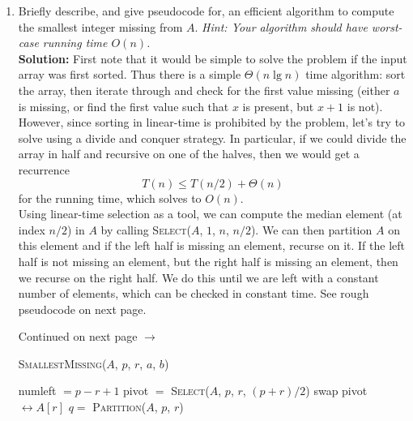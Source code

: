 \documentclass[letterpaper,11pt]{article}
\begin{document}
\begin{enumerate}
\begin{enumerate}
\item Briefly describe, and give pseudocode for, an efficient algorithm to compute the smallest integer missing from $A$. \emph{Hint: Your algorithm should have worst-case running time $O(n)$.} \\

\textbf{Solution:} First note that it would be simple to solve the problem if the input array was first sorted. Thus there is a simple $\Theta(n\lg n)$ time algorithm: sort the array, then iterate through and check for the first value missing (either $a$ is missing, or find the first value such that $x$ is present, but $x+1$ is not).\\

However, since sorting in linear-time is prohibited by the problem, let's try to solve using a divide and conquer strategy. In particular, if we could divide the array in half and recursive on one of the halves, then we would get a recurrence
\[T(n) \leq T(n/2) + \Theta(n)\]
for the running time, which solves to $O(n)$.\\

Using linear-time selection as a tool, we can compute the median element (at index $n/2$) in $A$ by calling \textsc{Select}($A$, $1$, $n$, $n/2$). We can then partition $A$ on this element and if the left half is missing an element, recurse on it. If the left half is not missing an element, but the right half is missing an element,  then we recurse on the right half. We do this until we are left with a constant number of elements, which can be checked in constant time. See rough pseudocode on next page.

\vfill{}
\hfill{}Continued on next page $\rightarrow$
\newpage

\begin{center}
\begin{algorithm}[!h]
\textsc{SmallestMissing}($A$, $p$, $r$, $a$, $b$)
\begin{algorithmic}[1]
\State numleft $ = p-r+1$
\State{}
            \State{}
        \EndIf
    \EndFor
\EndIf
\State
\State{}
\State pivot $=$ \textsc{Select}($A$, $p$, $r$, $(p+r)/2$) 
\State swap pivot $\leftrightarrow A[r]$
\State $q =$ \textsc{Partition}($A$, $p$, $r$)
 
\State{}
\Else {}
\State{}
\EndIf
\label{algorithm:smallest-missing}
\end{algorithmic}
\end{algorithm}
\end{center}


\end{enumerate}
\end{enumerate}
\end{document}
